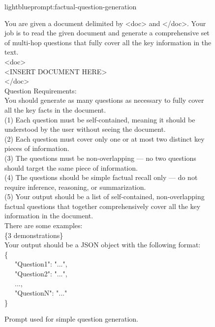 \documentclass{applemlr}
\numberwithin{equation}{section}
\begin{document}
\begin{figure}[!thbp]
\centering
\begin{minipage}{0.95\textwidth}
\begin{promptbox}[\color{black}{Prompt for Simple Question Generation}]{lightblue}{prompt:factual-question-generation}
\label{temp:factual_question_generation_prompt}

\ttfamily
You are given a document delimited by <doc> and </doc>. Your job is to read the given document and generate a comprehensive set of multi-hop questions that fully cover all the key information in the text. \\[4pt]

<doc> \\
<INSERT DOCUMENT HERE> \\
</doc> \\[4pt]

Question Requirements: \\[2pt]
You should generate as many questions as necessary to fully cover all the key facts in the document. \\
(1) Each question must be self-contained, meaning it should be understood by the user without seeing the document. \\
(2) Each question must cover only one or at most two distinct key pieces of information. \\
(3) The questions must be non-overlapping — no two questions should target the same piece of information. \\
(4) The questions should be simple factual recall only — do not require inference, reasoning, or summarization. \\
(5) Your output should be a list of self-contained, non-overlapping factual questions that together comprehensively cover all the key information in the document. \\[6pt]

There are some examples: \\
\{3 demonstrations\} \\[6pt]

Your output should be a JSON object with the following format: \\
\{ \\
\ \ \ "Question1": "...", \\
\ \ \ "Question2": "...", \\
\ \ \ ..., \\
\ \ \ "QuestionN": "..." \\
\} 
\end{promptbox}
\end{minipage}
\caption{Prompt used for simple question generation.}
\label{prompt_factual_question_generation}
\end{figure}
\end{document}

